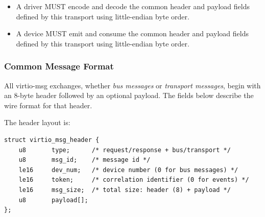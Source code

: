 \begin{itemize}
  \item A driver MUST encode and decode the common header and payload fields defined by this transport
        using little-endian byte order.
\end{itemize}

\begin{itemize}
  \item A device MUST emit and consume the common header and payload fields defined by this transport
        using little-endian byte order.
\end{itemize}

\subsubsection{Common Message Format}
\label{sec:Virtio Transport Options / Virtio Over Messages / Basic Concepts / Common Message Format}

All virtio-msg exchanges, whether \emph{bus messages} or \emph{transport
messages}, begin with an 8-byte header followed by an optional payload. The
fields below describe the wire format for that header.

The header layout is:
\begin{lstlisting}
struct virtio_msg_header {
    u8       type;      /* request/response + bus/transport */
    u8       msg_id;    /* message id */
    le16     dev_num;   /* device number (0 for bus messages) */
    le16     token;     /* correlation identifier (0 for events) */
    le16     msg_size;  /* total size: header (8) + payload */
    u8       payload[];
};
\end{lstlisting}

